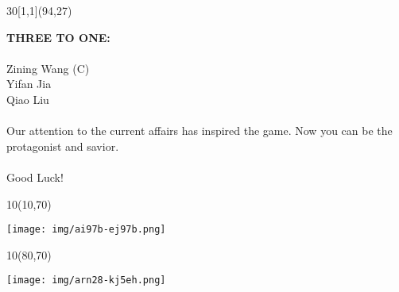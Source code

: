 \documentclass[hyperref={pdfpagelabels=false}]{beamer}
\begin{document}
\begin{frame}
	\begin{textblock}{30}[1,1](94,27)
		\begin{blankbox}
			\huge\textbf{{THREE TO ONE:}} \\\hspace*{\fill} \\
			\Large{Zining Wang (C)}\\ 
			Yifan Jia  \\
			Qiao Liu \\\hspace*{\fill} \\
			Our attention to the current affairs has inspired the game. Now you can be the protagonist and savior. \\\hspace*{\fill} \\\large{Good Luck!}
			
		\end{blankbox}
	\end{textblock}

	\begin{textblock}{10}(10,70)
		\begin{blankbox}
			\centering
			\texttt{[image: img/ai97b-ej97b.png]}
		\end{blankbox}
	\end{textblock}

	\begin{textblock}{10}(80,70)
		\begin{blankbox}
			\centering
			\texttt{[image: img/arn28-kj5eh.png]}
		\end{blankbox}
	\end{textblock}


\end{frame}
\end{document}
